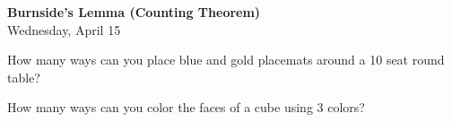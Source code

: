 \documentclass[12pt]{article}
\theoremstyle{plain}
\theoremstyle{definition}
\theoremstyle{remark}
\begin{document}
\Large
\begin{center}
 \textbf{\LARGE Burnside's Lemma (Counting Theorem)}\\
 Wednesday, April 15
\end{center}

How many ways can you place blue and gold placemats around a 10 seat round table?

\clearpage
How many ways can you color the faces of a cube using 3 colors?

~~
\clearpage
~~
\clearpage
~~
\end{document}
